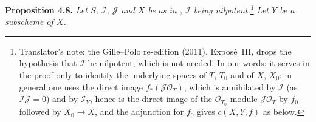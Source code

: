 

\medskip
\noindent{}\textbf{Proposition 4.8.}
\textit{Let \(S\), \(\mathscr I\), \(\mathscr J\) and \(X\) be as in
, \(\mathscr I\) being nilpotent.\footnote{Translator's note: the Gille--Polo re-edition (2011), Exposé~III, drops
the hypothesis that \(\mathscr I\) be nilpotent, which is not needed. In our
words: it serves in the proof only to identify the underlying spaces of \(T\),
\(T_0\) and of \(X\), \(X_0\); in general one uses the direct image
\(f_*(\mathscr J\mathscr O_T)\), which is annihilated by \(\mathscr I\) (as
\(\mathscr I\mathscr J=0\)) and by \(\mathscr I_Y\), hence is the direct image of
the \(\mathscr O_{T_0}\)-module \(\mathscr J\mathscr O_T\) by \(f_0\) followed by
\(X_0\to X\), and the adjunction for \(f_0\) gives \(c(X,Y,f)\) as below.} Let
\(Y\) be a subscheme of \(X\).}
